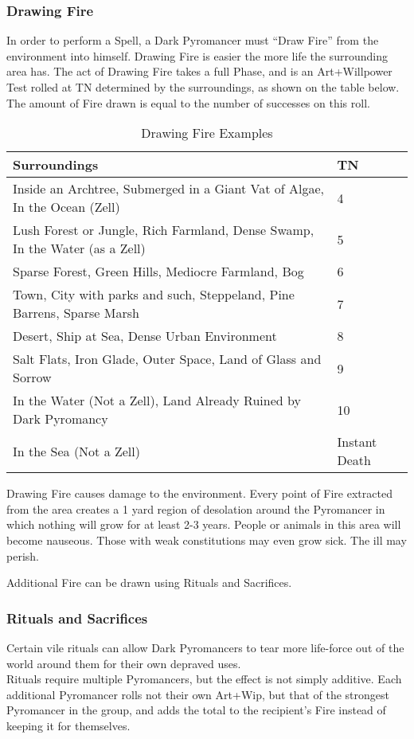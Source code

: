 \documentclass[oneside,11pt,english]{book}
\begin{document}
\subsubsection{Drawing Fire}
In order to perform a Spell, a Dark Pyromancer must “Draw Fire” from the environment into 
himself. Drawing Fire is easier the more life the surrounding area has. The act of Drawing Fire 
takes a full Phase, and is an Art+Willpower Test rolled at TN determined by the surroundings, 
as shown on the table below. The amount of Fire drawn is equal to the number of successes on 
this roll. 
\begin{table}[ht]
	\caption{Drawing Fire Examples}
	\label{tab:Drawing Fire Examples}
	\begin{tabu} spread 0pt {XX[-1]}
Surroundings&TN\\\toprule
Inside an Archtree, Submerged in a Giant  Vat of Algae, In the Ocean (Zell)  &4  \\
Lush Forest or Jungle, Rich Farmland,  Dense Swamp, In the Water (as a Zell) &5  \\
Sparse Forest, Green Hills, Mediocre  Farmland, Bog &6  \\
Town, City with parks and such, Steppeland,  Pine Barrens, Sparse Marsh  &7  \\
Desert, Ship at Sea, Dense Urban  Environment  &8  \\
Salt Flats, Iron Glade, Outer Space, Land  of Glass and Sorrow &9\\
In the Water (Not a Zell), Land Already Ruined by Dark Pyromancy  &10\\
In the Sea (Not a Zell)  &Instant Death  \\
	\end{tabu}
\end{table}
Drawing Fire causes damage to the environment. Every point of Fire extracted from the area 
creates a 1 yard region of desolation around the Pyromancer in which nothing will grow for at 
least 2-3 years. People or animals in this area will become nauseous. Those with weak 
constitutions may even grow sick. The ill may perish. 

Additional Fire can be drawn using Rituals and Sacrifices. 

\subsubsection{Rituals and Sacrifices}
Certain vile rituals can allow Dark Pyromancers to tear more life-force out of the world around 
them for their own depraved uses.\\
Rituals require multiple Pyromancers, but the effect is not simply additive. Each additional 
Pyromancer rolls not their own Art+Wip, but that of the strongest Pyromancer in the group, and 
adds the total to the recipient’s Fire instead of keeping it for themselves. 
\end{document}
